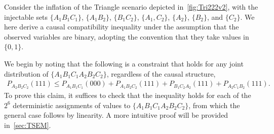 {%


\bigskip

\smallskip\nobreak



Consider the inflation of the Triangle scenario depicted in~\cref{fig:Tri222v2}, with the injectable sets $\{A_1 B_1 C_1\}$, $\{A_1 B_2\}$, $\{B_1 C_2\}$, $\{ A_1, C_2\}$, $\{A_2\}$, $\{B_2\}$, and $\{C_2\}$.
We here derive a causal compatibility inequality under the assumption that the observed variables are binary, adopting the convention that they take values in $\{0,1\}$.

We begin by noting that the following is a constraint that holds for any joint distribution of $\{A_1 B_1 C_1 A_2 B_2 C_2\}$, regardless of the causal structure, 
\begin{align}\label{eq:FritzF3raw}
	P_{A_2 B_2 C_2}(111) \leq P_{A_1 B_1 C_1}(000) + P_{A_1 B_2 C_2}(111) + P_{B_1 C_2 A_2}(111) + P_{A_2  C_1 B_2}(111).
\end{align}
To prove this claim, it suffices to check that the inequality holds for each of the $2^6$ deterministic assignments of values to $\{A_1 B_1 C_1 A_2 B_2 C_2\}$, from which the general case follows by linearity.  A more intuitive proof will be provided in~\cref{sec:TSEM}.

}
